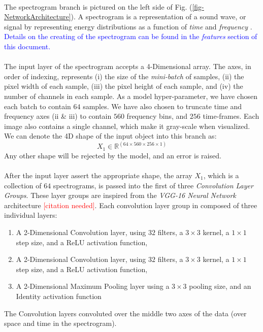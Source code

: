 \documentclass[12pt,letterpaper]{article}
\begin{document}
\paragraph*{}The spectrogram branch is pictured on the left side of Fig. (\ref{fig-NetworkArchitecture}). A spectrogram is a representation of a sound wave, or signal by representing energy distributions as a function of \textit{time} and \textit{frequency} \cite{White,Olsen,Kahn}. \textcolor{blue}{Details on the creating of the spectrogram can be found in the \textit{features} section of this document.}

\paragraph*{}The input layer of the spectrogram accepts a 4-Dimensional array. The axes, in order of indexing, represents (i) the size of the \textit{mini-batch} of samples, (ii) the pixel width of each sample, (iii) the pixel height of each sample, and (iv) the number of channels in each sample. As a model hyper-parameter, we have chosen each batch to contain $64$ samples. We have also chosen to truncate time and frequency axes (ii \& iii) to contain $560$ frequency bins, and $256$ time-frames. Each image also contains a single channel, which make it gray-scale when visualized. We can denote the 4D shape of the input object into this branch as:
\begin{equation}
\label{eqn-shapeX1}
X_1 \in \mathbb{R}^{(64 \times 560 \times 256 \times 1)}
\end{equation}
Any other shape will be rejected by the model, and an error is raised.

\paragraph*{}After the input layer assert the appropriate shape, the array $X_1$, which is a collection of $64$ spectrograms, is passed into the first of three \textit{Convolution Layer Groups}. These layer groups are inspired from the \textit{VGG-16 Neural Network} architecture \textcolor{red}{[citation needed]}. Each convolution layer group in composed of three individual layers: 
\begin{enumerate}
\item A 2-Dimensional Convolution layer, using $32$ filters, a $3 \times 3$ kernel, a $1 \times 1$ step size, and a ReLU activation function,
\item A 2-Dimensional Convolution layer, using $32$ filters, a $3 \times 3$ kernel, a $1 \times 1$ step size, and a ReLU activation function,
\item A 2-Dimensional Maximum Pooling layer using a $3 \times 3$ pooling size, and an Identity activation function
\end{enumerate}  
The Convolution layers convoluted over the middle two axes of the data (over space and time in the spectrogram). 
\end{document}
